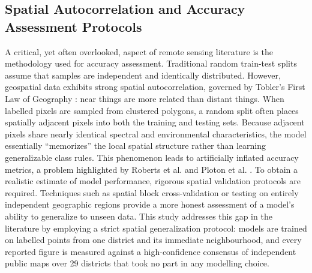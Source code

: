 \documentclass[conference]{IEEEtran}
\begin{document}
\subsection{Spatial Autocorrelation and Accuracy Assessment Protocols}
A critical, yet often overlooked, aspect of remote sensing literature is the methodology used for accuracy assessment. Traditional random train-test splits assume that samples are independent and identically distributed. However, geospatial data exhibits strong spatial autocorrelation, governed by Tobler's First Law of Geography \cite{r31}: near things are more related than distant things.
When labelled pixels are sampled from clustered polygons, a random split often places spatially adjacent pixels into both the training and testing sets. Because adjacent pixels share nearly identical spectral and environmental characteristics, the model essentially ``memorizes'' the local spatial structure rather than learning generalizable class rules. This phenomenon leads to artificially inflated accuracy metrics, a problem highlighted by Roberts et al. \cite{r18} and Ploton et al. \cite{r19}.
To obtain a realistic estimate of model performance, rigorous spatial validation protocols are required. Techniques such as spatial block cross-validation or testing on entirely independent geographic regions provide a more honest assessment of a model's ability to generalize to unseen data. This study addresses this gap in the literature by employing a strict spatial generalization protocol: models are trained on labelled points from one district and its immediate neighbourhood, and every reported figure is measured against a high-confidence consensus of independent public maps over 29 districts that took no part in any modelling choice.
\end{document}
